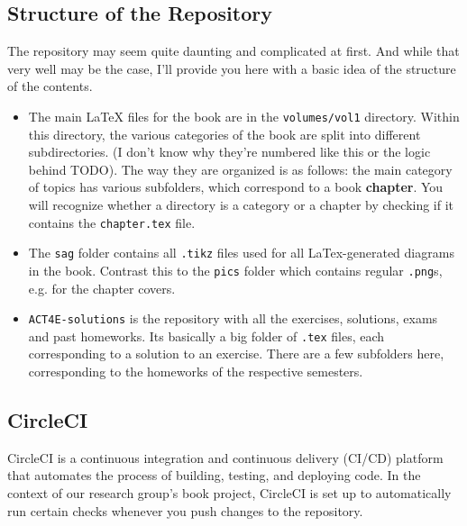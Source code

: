 \documentclass{article}
\begin{document}
\subsection{Structure of the Repository}
The repository may seem quite daunting and complicated at first. And while that very well may be the case, I'll provide you here with a basic idea of the structure of the contents.
\begin{itemize}
\item The main LaTeX files for the book are in the \texttt{volumes/vol1} directory. Within this directory, the various categories of the book are split into different subdirectories. (I don't know why they're numbered like this or the logic behind TODO). The way they are organized is as follows: the main category of topics has various subfolders, which correspond to a book \textbf{chapter}. You will recognize whether a directory is a category or a chapter by checking if it contains the \texttt{chapter.tex} file.
\item The \texttt{sag} folder contains all \texttt{.tikz} files used for all LaTex-generated diagrams in the book. Contrast this to the \texttt{pics} folder which contains regular \texttt{.png}s, e.g. for the chapter covers.
\item \texttt{ACT4E-solutions} is the repository with all the exercises, solutions, exams and past homeworks. Its basically a big folder of \texttt{.tex} files, each corresponding to a solution to an exercise. There are a few subfolders here, corresponding to the homeworks of the respective semesters.
\end{itemize}

\subsection{CircleCI}

CircleCI is a continuous integration and continuous delivery (CI/CD) platform that automates the process of building, testing, and deploying code. In the context of our research group's book project, CircleCI is set up to automatically run certain checks whenever you push changes to the repository.
\end{document}
